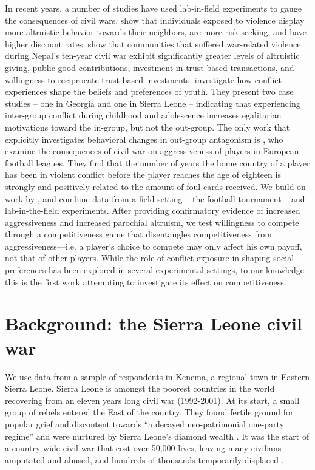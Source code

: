 In recent years, a number of studies have used lab-in-field experiments to gauge the consequences of civil wars. \cite{Voors2012} show that individuals exposed to violence display more altruistic behavior towards their neighbors, are more risk-seeking, and have higher discount rates. \cite{Gilligan2014} show that communities that suffered war-related violence during Nepal's ten-year civil war exhibit significantly greater levels of altruistic giving, public good contributions, investment in trust-based transactions, and willingness to reciprocate trust-based investments. \cite{Bauer2014} investigate how conflict experiences shape the beliefs and preferences of youth. They present two case studies – one in Georgia and one in Sierra Leone – indicating that experiencing inter-group conflict during childhood and adolescence increases egalitarian motivations toward the in-group, but not the out-group. The only work that explicitly investigates behavioral changes in out-group antagonism is \cite{Miguel2011b}, who examine the consequences of civil war on aggressiveness of players in European football leagues. They find that the number of years the home country of a player has been in violent conflict before the player reaches the age of eighteen is strongly and positively related to the amount of foul cards received. 
We build on work by \cite{Miguel2011b}, and combine data from a field setting – the football tournament – and lab-in-the-field experiments. After providing confirmatory evidence of increased aggressiveness and increased parochial altruism, we test willingness to compete through a competitiveness game that disentangles competitiveness from aggressiveness—i.e. a player’s choice to compete may only affect his own payoff, not that of other  players. While the role of conflict exposure in shaping social preferences has been explored in several experimental settings, to our knowledge this is the first work attempting to investigate its effect on competitiveness.

\section{Background: the Sierra Leone civil war}
\label{sec:slf:background}
We use data from a sample of respondents in Kenema, a regional town in Eastern Sierra Leone. Sierra Leone is amongst the poorest countries in the world recovering from an eleven years long civil war (1992-2001). At its start, a small group of rebels entered the East of the country. They found fertile ground for popular grief and discontent towards “a decayed neo-patrimonial one-party regime” \citep{Richards1999} and were nurtured by Sierra Leone’s diamond wealth \citep{Keen2005a}. It was the start of a country-wide civil war that cost over 50,000 lives, leaving many civilians amputated and abused, and hundreds of thousands temporarily displaced \citep{HumanRightsWatch1999a,Doucet2012a}.

